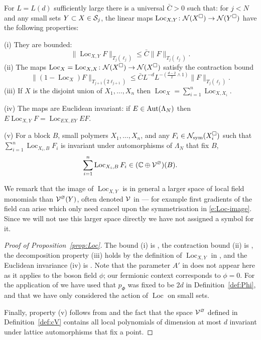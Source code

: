 \documentclass[11pt]{amsart}
\numberwithin{equation}{section}
\numberwithin{theorem}{section}
\newcommand{\1}{{\bf 1}}
\newcommand{\cVbulk}{\cV^\varnothing}
\newcommand{\dplus}{(\frac{d-2}{2} \wedge 1)}
\newcommand{\Loc}{\operatorname{Loc}}
\begin{document}
\begin{proposition} \label{prop:Loc} For $L=L(d)$ sufficiently large
  there is a universal $\bar C>0$ such that: for $j<N$ and any small
  sets $Y \subset X \in \mathcal S_j$, the linear maps
  $\Loc_{X,Y}\colon \cN(X^\square) \to \cN(Y^\square)$ have the following properties:
  \smallskip
  
  \noindent
  (i) They are bounded:
  \begin{equation} \label{e:Loc-bd}
    \|\Loc_{X,Y}F\|_{T_{j}(\ell_{j})} \leq \bar C \|F\|_{T_j(\ell_{j})}.
  \end{equation}
\smallskip
  \noindent
  (ii) The maps $\Loc_X \bydef \Loc_{X,X}\colon \cN(X^\square) \to \cN(X^\square)$ satisfy the contraction bound
  \begin{equation} \label{e:Loc-contract}
    \|(1-\Loc_X)F\|_{T_{j+1}(2\ell_{j+1})} \leq \bar C L^{-d}
    {L^{-\dplus}}
\|F\|_{T_j(\ell_j)}.
  \end{equation}
\smallskip
  \noindent
  (iii) If $X$ is the disjoint union of $X_1, \dots, X_n$ then
  $\Loc_X = \sum_{i=1}^n \Loc_{X,X_i}$.
  
  \smallskip
  \noindent
  (iv) The maps are Euclidean invariant:
  if $E\in {\rm Aut}(\Lambda_{N})$ then
  $E \Loc_{X,Y} F = \Loc_{EX,EY} EF$.

  \smallskip
  \noindent
  (v) For a block $B$, small polymers $X_1,\dots, X_n$, and any $F_i \in \mathcal N_{\rm sym}(X_i^\square)$ such that $\sum_{i=1}^n\Loc_{X_i,B} F_i$ is invariant
  under automorphisms of $\Lambda_N$ that fix $B$,
  \begin{equation} \label{e:Loc-image}
    \sum_{i=1}^n \Loc_{X_i,B}F_i \in (\C \oplus \cVbulk)(B).
  \end{equation}
\end{proposition}
%
We remark that the image of $\Loc_{X,Y}$ is in general a
larger space of local field monomials than $\cVbulk(Y)$, often denoted
$\mathcal V$ in \cite{MR3332939} --- for example first gradients of
the field can arise which only need cancel upon the symmetrisation
in \eqref{e:Loc-image}. Since we will not use this larger space directly
we have not assigned a symbol for it.

\begin{proof}[Proof of Proposition~\ref{prop:Loc}]
The bound (i) is \cite[Proposition~1.16]{MR3332939},
the contraction bound (ii) is \cite[Proposition~1.12]{MR3332939},
the decomposition property (iii) holds by the definition of $\Loc_{X,Y}$ in \cite[Definition~1.15]{MR3332939},
and the Euclidean invariance (iv) is \cite[Proposition~1.9]{MR3332939}.
Note that the parameter $A'$ in \cite[Proposition~1.12]{MR3332939} does
not appear here as it applies to the boson field $\phi$; our fermionic context corresponds to $\phi=0$.
For the application of \cite[Proposition~1.12]{MR3332939} we have used
that $p_\Phi$ was fixed to be $2d$ in Definition~\ref{def:Phi},
and that we have only considered the action of $\Loc$ on small sets.

Finally, property (v) follows from
\cite[Proposition~1.10]{MR3332939} and the fact that the space
$\cVbulk$ defined in Definition~\ref{def:cV} contains all local
polynomials of dimension at most $d$ invariant under lattice
automorphisms that fix a point. 
\end{proof}
\end{document}
